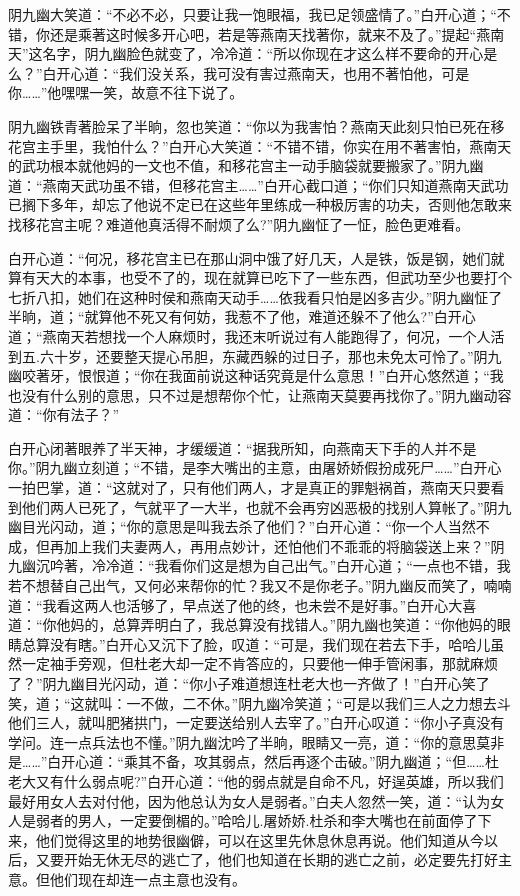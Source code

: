 \documentclass[12pt,oneside]{book}
\begin{document}
阴九幽大笑道：``不必不必，只要让我一饱眼福，我已足领盛情了。''白开心道；``不错，你还是乘著这时候多开心吧，若是等燕南天找著你，就来不及了。''提起``燕南天''这名字，阴九幽脸色就变了，冷冷道：``所以你现在才这么样不要命的开心是么？''白开心道：``我们没关系，我可没有害过燕南天，也用不著怕他，可是你\ldots\ldots{}''他嘿嘿一笑，故意不往下说了。

阴九幽铁青著脸呆了半晌，忽也笑道：``你以为我害怕？燕南天此刻只怕已死在移花宫主手里，我怕什么？''白开心大笑道：``不错不错，你实在用不著害怕，燕南天的武功根本就他妈的一文也不值，和移花宫主一动手脑袋就要搬家了。''阴九幽道：``燕南天武功虽不错，但移花宫主\ldots\ldots{}''白开心截口道；``你们只知道燕南天武功已搁下多年，却忘了他说不定已在这些年里练成一种极厉害的功夫，否则他怎敢来找移花宫主呢？难道他真活得不耐烦了么?''阴九幽怔了一怔，脸色更难看。

白开心道：``何况，移花宫主已在那山洞中饿了好几天，人是铁，饭是钢，她们就算有天大的本事，也受不了的，现在就算已吃下了一些东西，但武功至少也要打个七折八扣，她们在这种时侯和燕南天动手\ldots\ldots 依我看只怕是凶多吉少。''阴九幽怔了半晌，道；``就算他不死又有何妨，我惹不了他，难道还躲不了他么?''白开心道；``燕南天若想找一个人麻烦时，我还末听说过有人能跑得了，何况，一个人活到五.六十岁，还要整天提心吊胆，东藏西躲的过日子，那也未免太可怜了。''阴九幽咬著牙，恨恨道；``你在我面前说这种话究竟是什么意思！''白开心悠然道；``我也没有什么别的意思，只不过是想帮你个忙，让燕南天莫要再找你了。''阴九幽动容道：``你有法子？''

白开心闭著眼养了半天神，才缓缓道：``据我所知，向燕南天下手的人并不是你。''阴九幽立刻道；``不错，是李大嘴出的主意，由屠娇娇假扮成死尸\ldots\ldots{}''白开心一拍巴掌，道：``这就对了，只有他们两人，才是真正的罪魁祸首，燕南天只要看到他们两人已死了，气就平了一大半，也就不会再穷凶恶极的找别人算帐了。''阴九幽目光闪动，道；``你的意思是叫我去杀了他们？''白开心道：``你一个人当然不成，但再加上我们夫妻两人，再用点妙计，还怕他们不乖乖的将脑袋送上来？''阴九幽沉吟著，冷冷道：``我看你们这是想为自己出气。''白开心道；``一点也不错，我若不想替自己出气，又何必来帮你的忙？我又不是你老子。''阴九幽反而笑了，喃喃道：``我看这两人也活够了，早点送了他的终，也未尝不是好事。''白开心大喜道：``你他妈的，总算弄明白了，我总算没有找错人。''阴九幽也笑道：``你他妈的眼睛总算没有瞎。''白开心又沉下了脸，叹道：``可是，我们现在若去下手，哈哈儿虽然一定袖手旁观，但杜老大却一定不肯答应的，只要他一伸手管闲事，那就麻烦了？''阴九幽目光闪动，道：``你小子难道想连杜老大也一齐做了！''白开心笑了笑，道；``这就叫：一不做，二不休。''阴九幽冷笑道；``可是以我们三人之力想去斗他们三人，就叫肥猪拱门，一定要送给别人去宰了。''白开心叹道：``你小子真没有学问。连一点兵法也不懂。''阴九幽沈吟了半晌，眼睛又一亮，道：``你的意思莫非是\ldots\ldots{}''白开心道：``乘其不备，攻其弱点，然后再逐个击破。''阴九幽道；``但\ldots\ldots 杜老大又有什么弱点呢?''白开心道：``他的弱点就是自命不凡，好逞英雄，所以我们最好用女人去对付他，因为他总认为女人是弱者。''白夫人忽然一笑，道：``认为女人是弱者的男人，一定要倒楣的。''哈哈儿.屠娇娇.杜杀和李大嘴也在前面停了下来，他们觉得这里的地势很幽僻，可以在这里先休息休息再说。他们知道从今以后，又要开始无休无尽的逃亡了，他们也知道在长期的逃亡之前，必定要先打好主意。但他们现在却连一点主意也没有。
\end{document}
